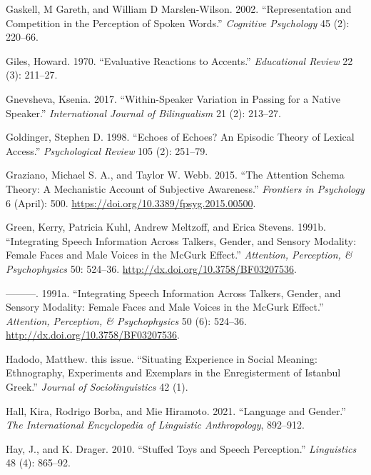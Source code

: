 \documentclass[
  letterpaper,
  DIV=11,
  numbers=noendperiod]{scrartcl}
\newlength{\cslhangindent}
\newenvironment{CSLReferences}[2] %
 {\begin{list}{}{%
  \setlength{\itemindent}{0pt}
  \setlength{\leftmargin}{0pt}
  \setlength{\parsep}{0pt}
  \ifodd #1
   \setlength{\leftmargin}{\cslhangindent}
   \setlength{\itemindent}{-1\cslhangindent}
  \fi
  \setlength{\itemsep}{#2\baselineskip}}}
 {\end{list}}
\begin{document}
\begin{CSLReferences}{1}{0}
Gaskell, M Gareth, and William D Marslen-Wilson. 2002. {``Representation
and Competition in the Perception of Spoken Words.''} \emph{Cognitive
Psychology} 45 (2): 220--66.

Giles, Howard. 1970. {``Evaluative Reactions to Accents.''}
\emph{Educational Review} 22 (3): 211--27.

Gnevsheva, Ksenia. 2017. {``Within-Speaker Variation in Passing for a
Native Speaker.''} \emph{International Journal of Bilingualism} 21 (2):
213--27.

Goldinger, Stephen D. 1998. {``Echoes of Echoes? An Episodic Theory of
Lexical Access.''} \emph{Psychological Review} 105 (2): 251--79.

Graziano, Michael S. A., and Taylor W. Webb. 2015. {``The Attention
Schema Theory: A Mechanistic Account of Subjective Awareness.''}
\emph{Frontiers in Psychology} 6 (April): 500.
\url{https://doi.org/10.3389/fpsyg.2015.00500}.

Green, Kerry, Patricia Kuhl, Andrew Meltzoff, and Erica Stevens. 1991b.
{``Integrating Speech Information Across Talkers, Gender, and Sensory
Modality: Female Faces and Male Voices in the McGurk Effect.''}
\emph{Attention, Perception, \& Psychophysics} 50: 524--36.
\url{http://dx.doi.org/10.3758/BF03207536}.

---------. 1991a. {``Integrating Speech Information Across Talkers,
Gender, and Sensory Modality: {Female} Faces and Male Voices in the
{McGurk} Effect.''} \emph{Attention, Perception, \& Psychophysics} 50
(6): 524--36. \url{http://dx.doi.org/10.3758/BF03207536}.

Hadodo, Matthew. this issue. {``Situating Experience in Social Meaning:
Ethnography, Experiments and Exemplars in the Enregisterment of Istanbul
Greek.''} \emph{Journal of Sociolinguistics} 42 (1).

Hall, Kira, Rodrigo Borba, and Mie Hiramoto. 2021. {``Language and
Gender.''} \emph{The International Encyclopedia of Linguistic
Anthropology}, 892--912.

Hay, J., and K. Drager. 2010. {``Stuffed Toys and Speech Perception.''}
\emph{Linguistics} 48 (4): 865--92.


\end{CSLReferences}
\end{document}
